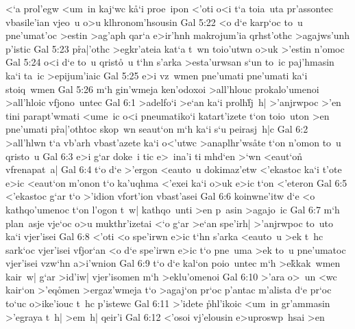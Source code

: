 <`a
prol'egw
<um~in
kaj`wc
k\r{a}`i
proe~ipon
<'oti
o<i
t`a
toia~uta
pr'assontec
vbasile'ian
vjeo~u
o>u
klhronom'hsousin\bibvsend
\vs Gal 5:22
<o
d`e
karp`oc
to~u
pne'umat'oc
>estin
>ag'aph
qar`a
e>ir'hnh
makrojum'ia
qrhst'othc
>agajws'unh
p'istic\bibvsend
\vs Gal 5:23
p\r{r}a|'othc
>egkr'ateia
kat`a
t~wn
toio'utwn
o>uk
>'estin
n'omoc\bibvsend
\vs Gal 5:24
o<i
d`e
to~u
qrist\r{o}~u
t`hn
s'arka
>esta'urwsan
s`un
to~ic
paj'hmasin
ka`i
ta~ic
>epijum'iaic\bibvsend
\vs Gal 5:25
e>i
vz~wmen
pne'umati
pne'umati
ka`i
stoiq~wmen\bibvsend
\vs Gal 5:26
m`h
gin'wmeja
ken'odoxoi
>all'hlouc
prokalo'umenoi
>all'hloic
vfjono~untec\bibvsend
\vs Gal 6:1
>adelfo`i
>e`an
ka`i
prolh\r{f}j~h|
>'anjrwpoc
>'en
tini
parapt'wmati
<ume~ic
o<i
pneumatiko`i
katart'izete
t`on
toio~uton
>en
pne'umati
p\r{r}a|\-'oth\-toc
skop~wn
seaut`on
m`h
ka`i
s`u
peirasj~h|c\bibvsend
\vs Gal 6:2
>all'hlwn
t`a
vb'arh
vbast'azete
ka`i
o<'utwc
>anaplhr'ws\r{a}te
t`on
n'omon
to~u
qristo~u\bibvsend
\vs Gal 6:3
e>i
g`ar
doke~i
tic
e>~ina'i
ti
mhd`en
>`wn
<eaut`on\r{}
vfrenapat~a|\bibvsend
\vs Gal 6:4
t`o
d`e
>'ergon
<eauto~u
dokimaz'etw
<'ekastoc
ka`i
t'ote
e>ic
<eaut`on
m'onon
t`o
ka'uqhma
<'exei
ka`i
o>uk
e>ic
t`on
<'eteron\bibvsend
\vs Gal 6:5
<'ekastoc
g`ar
t`o
>'idion
vfort'ion
vbast'asei\bibvsend
\vs Gal 6:6
koinwne'itw
d`e
<o
kathqo'umenoc
t`on
l'ogon
t~w|
kathqo~unti
>en
p~asin
>agajo~ic\bibvsend
\vs Gal 6:7
m`h
plan~asje
vje`oc
o>u
mukthr'izetai
<`o
g`ar
>e`an
spe'irh|
>'anjrwpoc
to~uto
ka`i
vjer'isei\bibvsend
\vs Gal 6:8
<'oti
<o
spe'irwn
e>ic
t`hn
s'arka
<eauto~u
>ek
t~hc
sark`oc
vjer'isei
vfjor`an
<o
d`e
spe'irwn
e>ic
t`o
pne~uma
>ek
to~u
pne'umatoc
vjer'isei
vzw`hn
a>i'wnion\bibvsend
\vs Gal 6:9
t`o
d`e
kal`on
poio~untec
m`h
>e\r{k}kak~wmen
kair~w|
g`ar
>id'iw|
vjer'isomen
m`h
>eklu'omenoi\bibvsend
\vs Gal 6:10
>'ara
o>~un
<wc
kair`on
>'eq\r{o}men
>ergaz'wmeja
t`o
>agaj`on
pr`oc
p'antac
m'alista
d`e
pr`oc
to`uc
o>ike'iouc
t~hc
p'istewc\bibvsend
\vs Gal 6:11
>'idete
\r{p}hl'ikoic
<um~in
gr'ammasin
>'egraya
t~h|
>em~h|
qeir'i\bibvsend
\vs Gal 6:12
<'osoi
vj'elousin
e>uproswp~hsai
>en

